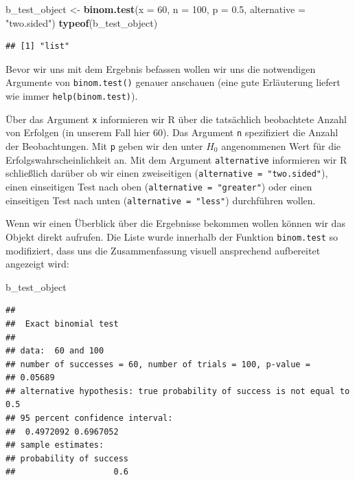 \documentclass[]{book}
\newenvironment{Shaded}{\begin{snugshade}}{\end{snugshade}}
\newcommand{\KeywordTok}[1]{\textcolor[rgb]{0.13,0.29,0.53}{\textbf{#1}}}
\newcommand{\DataTypeTok}[1]{\textcolor[rgb]{0.13,0.29,0.53}{#1}}
\newcommand{\DecValTok}[1]{\textcolor[rgb]{0.00,0.00,0.81}{#1}}
\newcommand{\FloatTok}[1]{\textcolor[rgb]{0.00,0.00,0.81}{#1}}
\newcommand{\StringTok}[1]{\textcolor[rgb]{0.31,0.60,0.02}{#1}}
\newcommand{\NormalTok}[1]{#1}
\begin{document}
\begin{Shaded}
\begin{Highlighting}[]
\NormalTok{b_test_object <-}\StringTok{ }\KeywordTok{binom.test}\NormalTok{(}\DataTypeTok{x =} \DecValTok{60}\NormalTok{, }\DataTypeTok{n =} \DecValTok{100}\NormalTok{, }\DataTypeTok{p =} \FloatTok{0.5}\NormalTok{, }\DataTypeTok{alternative =} \StringTok{"two.sided"}\NormalTok{)}
\KeywordTok{typeof}\NormalTok{(b_test_object)}
\end{Highlighting}
\end{Shaded}

\begin{verbatim}
## [1] "list"
\end{verbatim}

Bevor wir uns mit dem Ergebnis befassen wollen wir uns die notwendigen
Argumente von \texttt{binom.test()} genauer anschauen (eine gute
Erläuterung liefert wie immer \texttt{help(binom.test)}).

Über das Argument \texttt{x} informieren wir R über die tatsächlich
beobachtete Anzahl von Erfolgen (in unserem Fall hier 60). Das Argument
\texttt{n} spezifiziert die Anzahl der Beobachtungen. Mit \texttt{p}
geben wir den unter \(H_0\) angenommenen Wert für die
Erfolgswahrscheinlichkeit an. Mit dem Argument \texttt{alternative}
informieren wir R schließlich darüber ob wir einen zweiseitigen
(\texttt{alternative\ =\ "two.sided"}), einen einseitigen Test nach oben
(\texttt{alternative\ =\ "greater"}) oder einen einseitigen Test nach
unten (\texttt{alternative\ =\ "less"}) durchführen wollen.

Wenn wir einen Überblick über die Ergebnisse bekommen wollen können wir
das Objekt direkt aufrufen. Die Liste wurde innerhalb der Funktion
\texttt{binom.test} so modifiziert, dass uns die Zusammenfassung visuell
ansprechend aufbereitet angezeigt wird:

\begin{Shaded}
\begin{Highlighting}[]
\NormalTok{b_test_object}
\end{Highlighting}
\end{Shaded}

\begin{verbatim}
## 
##  Exact binomial test
## 
## data:  60 and 100
## number of successes = 60, number of trials = 100, p-value =
## 0.05689
## alternative hypothesis: true probability of success is not equal to 0.5
## 95 percent confidence interval:
##  0.4972092 0.6967052
## sample estimates:
## probability of success 
##                    0.6
\end{verbatim}
\end{document}
